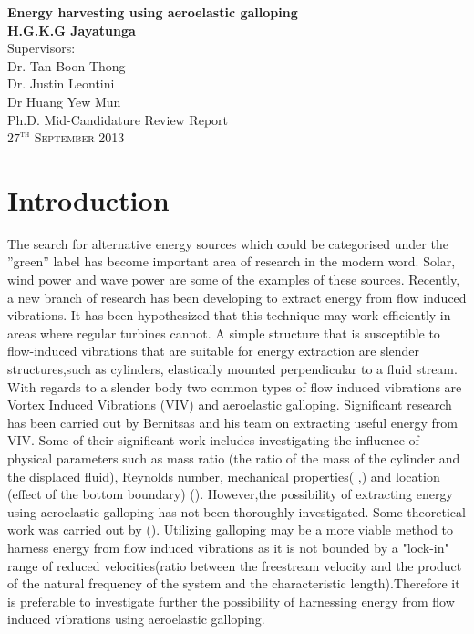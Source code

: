 \documentclass{article}
\begin{document}
\begin{titlepage}
\begin{center}
{\huge \bfseries Energy harvesting using aeroelastic galloping}\\[2.5cm]
{\LARGE \bfseries H.G.K.G Jayatunga}\\[2.5cm]
\Large Supervisors:\\[0.5cm] Dr. Tan Boon Thong \\[0.4cm] Dr. Justin Leontini \\[0.5cm] Dr Huang Yew Mun\\[6.5cm]
\Large Ph.D. Mid-Candidature Review Report\\

\vfill
\textsc{\Large $27^{\text{th}}$ September 2013}
\end{center}
\end{titlepage}
\tableofcontents
\clearpage
\section{Introduction}
The search for alternative energy sources which could be categorised under the ”green” label has become important area of research in the modern word. Solar, wind power and wave power are some of the examples of these sources. Recently, a new branch of research has been developing to extract energy from flow induced vibrations. It has been hypothesized that this technique may work efficiently in areas where regular turbines cannot. 
A simple structure that is susceptible to flow-induced vibrations that are suitable for energy extraction are slender structures,such as cylinders, elastically mounted perpendicular to a fluid stream. With regards to a slender body two common types of   flow induced vibrations are Vortex Induced Vibrations (VIV) and aeroelastic galloping. Significant research has been carried out by Bernitsas and his team on extracting useful energy from VIV. Some of their significant work includes investigating the influence  of physical parameters such as mass ratio (the ratio of the mass of the cylinder and the displaced fluid), Reynolds number, mechanical properties(\cite{Raghavan2010a} ,\cite{Lee2011b}) and location (effect of the bottom boundary) (\cite{Raghavan2009}). However,the possibility of extracting energy using aeroelastic galloping has not been thoroughly investigated. Some theoretical work was carried out by (\cite{Barrero-Gil2010a}). Utilizing galloping may be a more viable method to harness energy from flow induced vibrations as it is not bounded by a "lock-in" range of reduced velocities(ratio between the freestream velocity and the product of the natural frequency of the system and the characteristic length).Therefore it is preferable to investigate further the possibility of harnessing energy from flow induced vibrations using aeroelastic galloping. 
\end{document}
